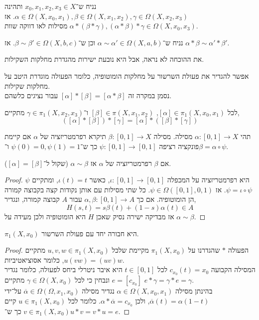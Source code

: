 \begin{remark}
	נניח ש־$x_0, x_1, x_2, x_3 \in X$ ותהינה $\alpha \in \Omega(X, x_0, x_1), \beta \in \Omega(X, x_1, x_2), \gamma \in \Omega(X, x_2, x_3)$.
	אז $\alpha * (\beta * \gamma), (\alpha * \beta) * \gamma \in \Omega(X, x_0, x_3)$ מסילות לאו דווקה שוות.
\end{remark}
\begin{proposition}
	נניח ש־$\alpha \sim \alpha' \in \Omega(X, a, b)$ וכן ש־$\beta \sim \beta' \in \Omega(X, b, c)$.
	אז $\alpha * \beta \sim \alpha' * \beta'$.
\end{proposition}
את ההוכחה לא נראה, אבל היא נובעת ישירות מהגדרת מחלקות השקילות.
\begin{corollary}
	אפשר להגדיר את פעולת השרשור על מחלקות הומוטופיה, כלומר הפעולה מוגדרת היטב על מחלקות שקילות. \\
	נסמן במקרה זה $[\alpha] * [\beta] = [\alpha * \beta]$ עבור נציגים כלשהם.
\end{corollary}
\begin{proposition}
	לכל $[\alpha] \in \pi_1(X, x_0, x_1)$, $[\beta] \in \pi(X, x_1, x_2)$ ו־$\gamma \in \pi_1(X, x_2, x_3)$ מתקיים,
	\[
		([\alpha] * [\beta]) * [\gamma]
		= [\alpha] * ([\beta] * [\gamma])
	\]
\end{proposition}
\begin{definition}
	תהי $\alpha : [0, 1] \to X$ מסילה.
	מסילה $\beta : [0, 1] \to X$ תיקרא רפרמטריזציה של $\alpha$ אם קיימת פונקציה רציפה $\psi : [0, 1] \to [0, 1]$ כך ש־$\psi(0) = 0, \psi(1) = 1$ ו־$\beta = \alpha \circ \psi$.
\end{definition}
\begin{proposition}
	אם $\beta$ רפרמטריזציה של $\alpha$ אז $\alpha \sim \beta$ (שקול ל־$[\alpha] = [\beta]$).
\end{proposition}
\begin{proof}
	$\psi$ היא רפרמטריזציה על המכפלה $\iota : [0, 1] \to [0, 1]$, כאשר $\iota(t) = t$, ומתקיים $\psi = \iota \circ \psi$.
	אז $\psi \in \Omega([0, 1], 0, 1)$.
	כל שתי מסילות עם אותן נקודות קצה בקבוצה קמורה הן הומוטופיה.
	אם כך $\alpha, \beta : [0, 1] \to A$ עבור $A$ קבוצה קמורה, ונגדיר,
	\[
		H(s, t)
		= s \beta(t) + (1 - s) \alpha(t) \in A
	\]
	אז מבדיקה ישירה נסיק שאכן $H$ היא הומוטופיה ולכן מעידה על $\alpha \sim \beta$.
\end{proof}
\begin{corollary}
	$\pi_1(X, x_0)$ היא חבורה יחד עם פעולת השרשור.
\end{corollary}
\begin{proof}
	הפעולה $*$ שהגדרנו על $\pi_1(X, x_0)$ מקיימת שלכל $u, v, w \in \pi_1(X, x_0)$ מתקיים $u (v w) = (u v) w$, כלומר אסוציאטיביות. \\
	המסילה הקבועה $c_{x_0}(t) = x_0$ לכל $t \in [0, 1]$ היא איבר ניטרלי ביחס לפעולה, כלומר נגדיר $e = [c_{x_0}]$ ונבחין כי לכל $\gamma \in \Omega(X, x_0)$ מתקיים $e * \gamma = \gamma * e = \gamma$. \\
	בהינתן מסילה $\alpha \in \Omega(X, x_0, x_1)$ נגדיר מסילה $\overline{\alpha} \in \Omega(\Omega, x_1, x_0)$ על־ידי $\overline{\alpha}(t) = \alpha(1 - t)$, ולכן $\alpha * \overline{\alpha} = c_{x_0}$.
	כלומר לכל $u \in \pi_1(X, x_0)$ קיים $v \in \pi_1(X, x_0)$ כך ש־$u * v = v * u = e$.
\end{proof}
